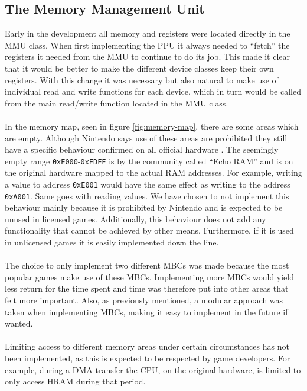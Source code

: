 \subsection{The Memory Management Unit}
Early in the development all memory and registers were located directly in the MMU class. 
When first implementing the PPU it always needed to ``fetch'' the registers it needed from the MMU to continue to do its job.
This made it clear that it would be better to make the different device classes keep their own registers.
With this change it was necessary but also natural to make use of individual read and write functions for each device, which in turn would be called from the main read/write function located in the MMU class.
\\\\
In the memory map, seen in figure \ref{fig:memory-map}, there are some areas which are empty.
Although Nintendo says use of these areas are prohibited they still have a specific behaviour confirmed on all official hardware \cite{pandocsechoram}.
The seemingly empty range \texttt{0xE000}-\texttt{0xFDFF} is by the community called ``Echo RAM'' and is on the original hardware mapped to the actual RAM addresses.
For example, writing a value to address \texttt{0xE001} would have the same effect as writing to the address \texttt{0xA001}. Same goes with reading values.
We have chosen to not implement this behaviour mainly because it is prohibited by Nintendo and is expected to be unused in licensed games. 
Additionally, this behaviour does not add any functionality that cannot be achieved by other means.
Furthermore, if it is used in unlicensed games it is easily implemented down the line.  
\\\\
The choice to only implement two different MBCs was made because the most popular games make use of these MBCs. 
Implementing more MBCs would yield less return for the time spent and time was therefore put into other areas that felt more important. Also, as previously mentioned, a modular approach was taken when implementing MBCs, making it easy to implement in the future if wanted.
\\\\
Limiting access to different memory areas under certain circumstances has not been implemented, as this is expected to be respected by game developers. For example, during a DMA-transfer the CPU, on the original hardware, is limited to only access HRAM during that period.

